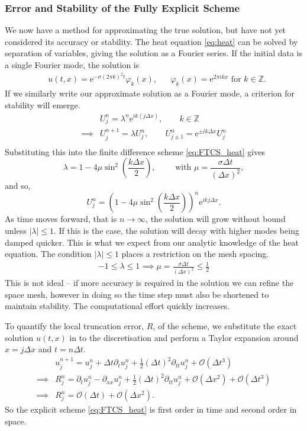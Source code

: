 \documentclass[11pt, a4pape draft]{article}
\renewcommand{\phi}{\varphi}
\newcommand{\Z}{\mathbb{Z}}
\newcommand{\Dt}{\Delta t}
\newcommand{\Dx}{\Delta x}
\begin{document}
        \subsubsection*{Error and Stability of the Fully Explicit Scheme}
        We now have a method for approximating the true solution, but have not yet considered its accuracy or stability. The heat equation \eqref{eq:heat} can be solved by separation of variables, giving the solution as a Fourier series. If the initial data is a single Fourier mode, the solution is
        \begin{align*}
            &u(t,x) = \mathrm{e}^{-\sigma(2\pi k)^2 t} \phi_k(x), && \phi_k(x) = \mathrm{e}^{2\pi i k x} \text{ for } k \in \Z.
        \end{align*} 
        If we similarly write our approximate solution as a Fourier mode, a criterion for stability will emerge.
        \begin{align*}
            &U^n_j = \lambda^n \mathrm{e}^{ik(j\Dx)}, \qquad k \in \Z \\
            \implies &U^{n+1}_j = \lambda U^n_j, \qquad U^n_{j\pm 1} = \mathrm{e}^{\pm ik\Dx}U^n_j  \\
        \end{align*}
        Substituting this into the finite difference scheme \eqref{eq:FTCS_heat} gives
        \[
            \lambda = 1 - 4\mu \sin^2\left(\frac{k\Dx}{2}\right), \qquad \text{ with } \mu = \frac{\sigma \Dt}{(\Dx) ^2},
        \]
        and so,
        \[
            U^n_j = \left(1 - 4\mu \sin^2\left(\frac{k\Dx}{2}\right)\right)^n\mathrm{e}^{ikj\Dx}.
        \]
        As time moves forward, that is $n \to \infty$, the solution will grow without bound unless $|\lambda|\leq 1$. If this is the case, the solution will decay with higher modes being damped quicker. This is what we expect from our analytic knowledge of the heat equation. The condition $|\lambda|\leq 1$ places a restriction on the mesh spacing.
        \begin{align*}
            -1 \leq \lambda \leq 1 \implies  \mu = \frac{\sigma \Dt}{(\Dx) ^2} \leq \frac{1}{2}
        \end{align*}
        This is not ideal -- if more accuracy is required in the solution we can refine the space mesh, however in doing so the time step must also be shortened to maintain stability. The computational effort quickly increases.
        
        
        To quantify the local truncation error, $R$, of the scheme, we substitute the exact solution $u(t,x)$ in to the discretisation and perform a Taylor expansion around $x=j\Dx$ and $t = n\Dt$.  
        \begin{align*}
            &u^{n+1}_j = u^n_j + \Dt \partial_t u^n_j + \frac{1}{2}(\Dt)^2 \partial_{tt} u^n_j + \mathcal{O}(\Dt^3)\\
            \implies& R^n_j = \partial_t u^n_j - \partial_{xx}u^n_j + \frac{1}{2}(\Dt)^2 \partial_{tt} u^n_j +  \mathcal{O}(\Dx^2)+\mathcal{O}(\Dt^3)\\
            \implies& R^n_j = \mathcal{O}(\Dt)+\mathcal{O}(\Dx^2).
        \end{align*}
        So the explicit scheme \eqref{eq:FTCS_heat} is first order in time and second order in space. 
        
\end{document}
